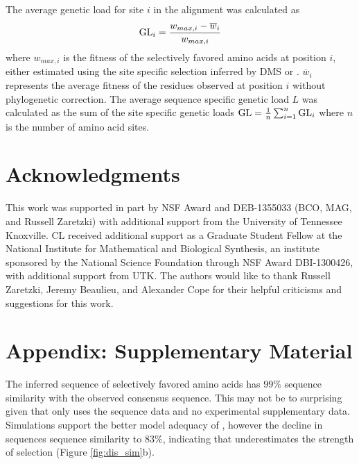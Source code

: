\documentclass[fleqn,letterpaper]{article}
\newcommand\suppl{\par
  \setcounter{section}{0}%
  \setcounter{subsection}{0}%
  \setcounter{table}{0}%
  \setcounter{figure}{0}%
  \setcounter{equation}{0}%
  \gdef\thesection{\Alph{section}.1}%
  \def\thefigure{\Alph{section}\arabic{figure}}%
  \def\thetable{\Alph{section}\arabic{table}}%
  \def\theequation {\Alph{section}\arabic{equation}}}
\begin{document}
The average genetic load for site $i$ in the alignment was calculated as
\begin{equation}
\text{GL}_i = \frac{w_{max,i} - \overline{w}_i}{w_{max,i}}
\end{equation}
where $w_{max,i}$ is the fitness of the selectively favored amino acids at position $i$, either estimated using the site specific selection inferred by DMS or \selac.
$\overline{w}_i$ represents the average fitness of the residues observed at position $i$ without phylogenetic correction.
The average sequence specific genetic load $L$ was calculated as the sum of the site specific genetic loads $\text{GL} = \frac{1}{n}\sum_{i=1}^n \text{GL}_i$ where $n$ is the number of amino acid sites.

\section{Acknowledgments}
This work was supported in part by NSF Award and DEB-1355033 (BCO, MAG, and Russell Zaretzki) with additional support from the University of Tennessee Knoxville. 
CL received additional support as a Graduate Student Fellow at the National Institute for Mathematical and Biological Synthesis, an institute sponsored by the National Science Foundation through NSF Award DBI-1300426, with additional support from UTK. 
The authors would like to thank Russell Zaretzki, Jeremy Beaulieu, and Alexander Cope for their helpful criticisms and suggestions for this work.


 

\clearpage


\suppl
\setcounter{section}{18} %
\setcounter{page}{1}
\renewcommand{\thepage}{S\arabic{page}} %

\section{Appendix: Supplementary Material}

The \selac inferred sequence of selectively favored amino acids has $99 \%$ sequence similarity with the observed consensus sequence.
This may not be to surprising given that \selac only uses the sequence data and no experimental supplementary data.
Simulations support the better model adequacy of \selac, however the decline in sequences sequence similarity to $83 \%$, indicating that \selac underestimates the strength of selection (Figure \ref{fig:dis_sim}b).
\end{document}

